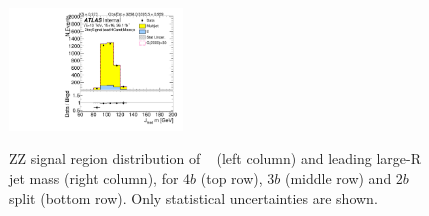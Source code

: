 \begin{figure}[htbp!]
\begin{center}
\includegraphics[width=0.41\textwidth,angle=-90]{figures/boosted/ZZ/Moriond_ZZ_TwoTag_split_Signal_leadHCand_Mass_s.pdf}\\
\end{center}
\caption{ZZ signal region distribution of \mtwoJ~ (left column) and leading large-R jet mass (right column), for $4b$ (top row), $3b$ (middle row) and $2b$ split (bottom row). Only statistical uncertainties are shown.}
\label{CRSB:ZZSR_Distribution}
\end{figure}

% 

% 

% 


